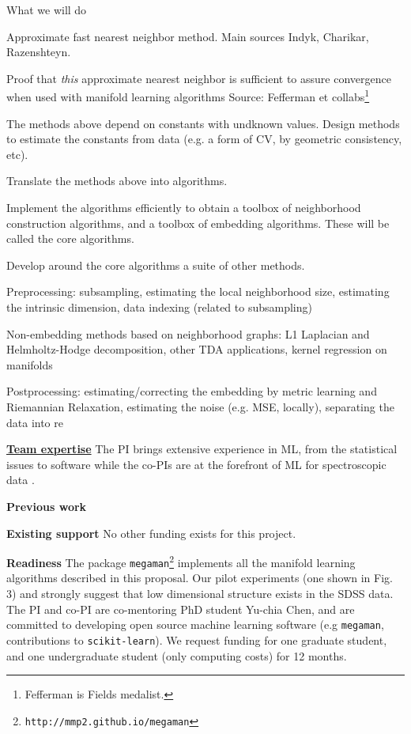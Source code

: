 \documentclass[floatfix,11pt]{revtex4-1}
\begin{document}
What we will do
\bit
\item Approximate fast nearest neighbor method. Main sources Indyk, Charikar, Razenshteyn. 
\item Proof that {\em this} approximate nearest neighbor is sufficient to assure convergence when used with manifold learning algorithms Source: Fefferman et collabs\footnote{Fefferman is Fields medalist.} 
\item The methods above depend on constants with undknown values. Design methods to estimate the constants from data (e.g. a form of CV, by geometric consistency, etc).
\item Translate the methods above into algorithms. 
\item Implement the algorithms efficiently to obtain a toolbox of neighborhood construction algorithms, and a toolbox of embedding algorithms. These will be called the core algorithms. 
\item Develop around the core algorithms a suite of other methods.
 \bit
 \item Preprocessing: subsampling, estimating the local neighborhood size, estimating the intrinsic dimension, data indexing (related to subsampling)
 \item Non-embedding methods based on neighborhood graphs: L1 Laplacian and Helmholtz-Hodge decomposition, other TDA applications, kernel regression on manifolds
 \item Postprocessing: estimating/correcting the embedding by metric learning and Riemannian Relaxation, estimating the noise (e.g. MSE, locally), separating the data into re
 \eit
\eit

\underline{\bf Team expertise}
The PI brings extensive experience in ML, from the statistical issues \cite{PerraultMMcQueen:nips17} to software  while the co-PIs are at the forefront of ML for spectroscopic data \cite{vanderplasConnolly:09}.

{\bf Previous work}

{\bf Existing support} No other funding exists for this project. 

{\bf Readiness} The package {\tt megaman}\footnote{{\tt http://mmp2.github.io/megaman}} \cite{mcqueenMVdpZ:megaman16,*mcqueenMVdpZ:megaman-jmlr16} implements all the manifold learning algorithms described in this proposal. Our pilot experiments (one shown in Fig. 3) and \cite{Yip04} strongly suggest that low dimensional structure exists in the SDSS data. The PI and co-PI are co-mentoring PhD student Yu-chia Chen, and are committed to developing open source machine learning software (e.g {\tt megaman}, contributions to {\tt scikit-learn}). We request funding for one graduate student, and one undergraduate student (only computing costs) for 12 months.
\end{document}
